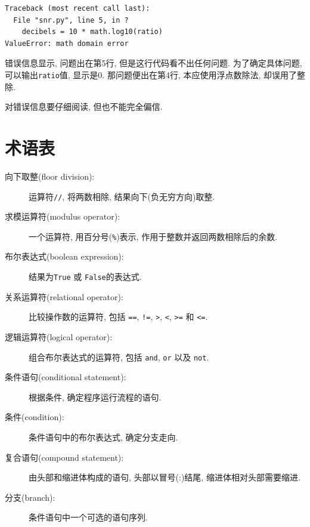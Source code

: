 \documentclass[10pt]{book}
\begin{document}
\begin{verbatim}
Traceback (most recent call last):
  File "snr.py", line 5, in ?
    decibels = 10 * math.log10(ratio)
ValueError: math domain error
\end{verbatim}
%
错误信息显示, 问题出在第5行, 
但是这行代码看不出任何问题. 
为了确定具体问题, 可以输出{\tt ratio}值, 显示是0.
那问题便出在第4行, 本应使用浮点数除法, 却误用了整除.

对错误信息要仔细阅读, 但也不能完全偏信. 


\section{术语表}

\begin{description}


\item[向下取整(floor division):] 运算符{\tt //}, 将两数相除, 结果向下(负无穷方向)取整.

\item[求模运算符(modulus operator):]  一个运算符, 用百分号({\tt \%})表示, 作用于整数并返回两数相除后的余数. 

\item[布尔表达式(boolean expression):]  结果为{\tt True} 或 {\tt False}的表达式.

\item[关系运算符(relational operator):] 比较操作数的运算符, 包括 
{\tt ==}, {\tt !=}, {\tt >}, {\tt <}, {\tt >=} 和 {\tt <=}.

\item[逻辑运算符(logical operator):] 组合布尔表达式的运算符, 包括 
{\tt and}, {\tt or} 以及 {\tt not}.

\item[条件语句(conditional statement):]  根据条件, 确定程序运行流程的语句.

\item[条件(condition):] 条件语句中的布尔表达式, 确定分支走向.

\item[复合语句(compound statement):]  由头部和缩进体构成的语句, 头部以冒号(:)结尾, 
缩进体相对头部需要缩进.

\item[分支(branch):] 条件语句中一个可选的语句序列. 


\end{description}
\end{document}
